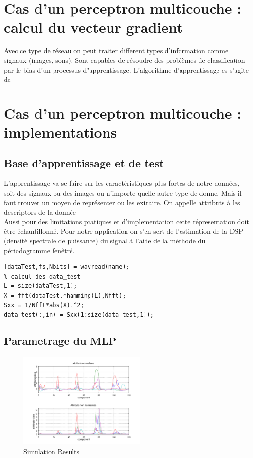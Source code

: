 \documentclass[journal]{IEEEtran}
\begin{document}
\section{Cas d’un perceptron multicouche : calcul du vecteur gradient}\blindtext

Avec ce type de réseau on peut traiter different types d'information comme signaux (images, sons). 
Sont capables de résoudre des problèmes de classification par le bias d'un processus d"apprentissage.
L'algorithme d'apprentissage es s'agite de 


%
%
\section{Cas d’un perceptron multicouche : implementations}

\subsection{Base d'apprentissage et de test}
L'apprentissage va se faire sur les caractéristiques plus fortes de notre données, soit des signaux ou des images ou n'importe quelle autre type de donne. Mais il faut trouver un moyen de représenter ou  les extraire. On appelle attributs à les descriptors de la donnée\\
Aussi pour des limitations pratiques et d'implementation cette répresentation doit être échantillonné.
Pour notre application on s'en sert de l'estimation de la DSP (densité spectrale de puissance) du signal à l’aide de la méthode du périodogramme fenêtré.



\begin{lstlisting}[caption={Code puor initialisation des variables},label=code_initial]
[dataTest,fs,Nbits] = wavread(name);
% calcul des data_test
L = size(dataTest,1);
X = fft(dataTest.*hamming(L),Nfft);
Sxx = 1/Nfft*abs(X).^2;
data_test(:,in) = Sxx(1:size(data_test,1));
\end{lstlisting}




\subsection{Parametrage du MLP}

\begin{figure}[h]
	\centering
	\includegraphics[width=2.5in]{../OctaveNeurons/rs3}
	\caption{Simulation Results}
	\label{fig_sim}
\end{figure}
\end{document}
